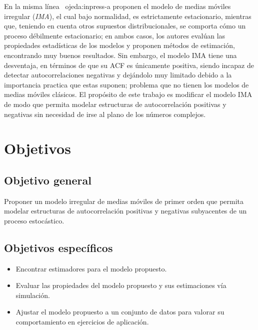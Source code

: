  
 
En la misma línea \ {ojeda:inpress-a} proponen el modelo de medias móviles irregular (\emph{IMA}), el cual bajo normalidad,
es estrictamente estacionario, mientras que, teniendo en cuenta otros 
supuestos distribucionales, se comporta cómo un proceso débilmente 
estacionario; en ambos casos, los autores evalúan las propiedades
estadísticas de los modelos y proponen métodos de estimación, 
encontrando muy buenos resultados. Sin embargo, el modelo IMA 
tiene una desventaja, en términos de que su ACF es únicamente 
positiva, siendo incapaz de detectar autocorrelaciones negativas 
y dejándolo muy limitado debido a la importancia practica que estas 
suponen; problema que no tienen los modelos de medias móviles clásicos.
El propósito de este trabajo es modificar el modelo IMA de modo que 
permita modelar estructuras de autocorrelación positivas y negativas
sin necesidad de irse al plano de los números complejos.
 
\section{Objetivos}
\subsection{Objetivo general}
Proponer un modelo irregular de medias móviles de primer orden que 
permita modelar estructuras de autocorrelación positivas y negativas
subyacentes de un proceso estocástico.
\subsection{Objetivos específicos}
\begin{itemize}
    \item Encontrar estimadores para el modelo propuesto.
    \item Evaluar las propiedades del modelo propuesto y sus estimaciones vía simulación.
    \item Ajustar el modelo propuesto a un conjunto de datos para valorar su comportamiento en ejercicios de aplicación.
\end{itemize}